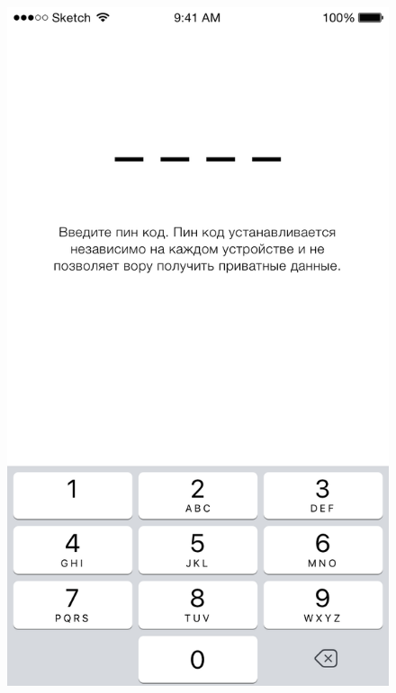 \begin{figure}[h]
\begin{minipage}{.33\textwidth}
  \includegraphics[height=0.25\textheight]{inc/img/ui/pin_code.png}
  \label{sec:usage:pin:enter}
\end{minipage}
\begin{minipage}{.33\textwidth}
  \centering

\end{minipage}
\end{figure}
